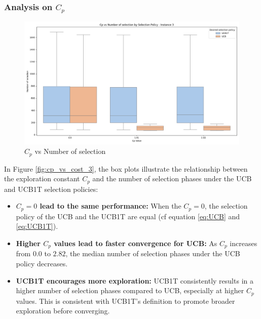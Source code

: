 \subsubsection*{Analysis on $C_p$}
\begin{figure}[!ht]
    \centering
    \includegraphics[width=\textwidth]{Figures/3 - cp_vs_selection.png}
    \caption{$C_p$ vs Number of selection}
    \label{fig:cp_vs_selection_3}
\end{figure}

In Figure \ref{fig:cp_vs_cost_3}, the box plots illustrate the relationship between the exploration constant \( C_p \) and the number of selection phases under the UCB and UCB1T selection policies:

\begin{itemize}
    \item \textbf{\( C_p = 0 \) lead to the same performance:}
          When the $C_p=0$, the selection policy of the UCB and the UCB1T are equal (cf equation \ref{eq:UCB} and \ref{eq:UCB1T}).
    \item \textbf{Higher \( C_p \) values lead to faster convergence for UCB:}
          As \( C_p \) increases from $0.0$ to $2.82$, the median number of selection phases under the UCB policy decreases.

    \item \textbf{UCB1T encourages more exploration:}
          UCB1T consistently results in a higher number of selection phases compared to UCB, especially at higher \( C_p \) values. This is consistent with UCB1T's definition to promote broader exploration before converging.
\end{itemize}

